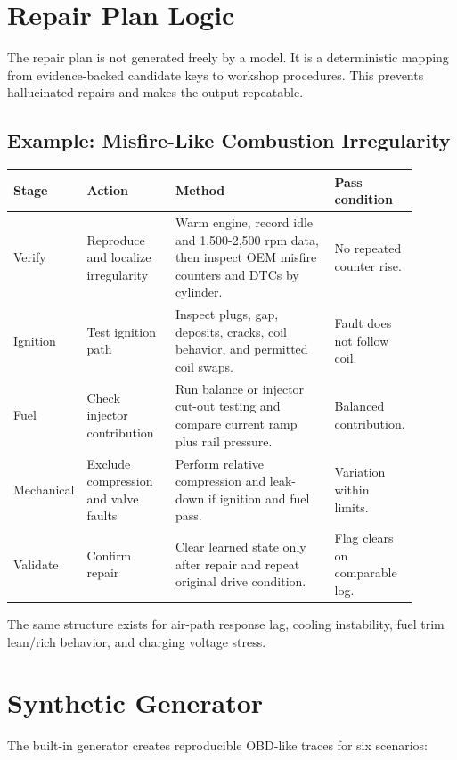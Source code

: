 \documentclass[11pt,a4paper]{article}
\begin{document}
\section{Repair Plan Logic}

The repair plan is not generated freely by a model. It is a deterministic mapping from evidence-backed candidate keys to workshop procedures. This prevents hallucinated repairs and makes the output repeatable.

\subsection{Example: Misfire-Like Combustion Irregularity}

\begin{longtable}{L{0.14\linewidth}L{0.22\linewidth}L{0.40\linewidth}L{0.14\linewidth}}
\toprule
\textbf{Stage} & \textbf{Action} & \textbf{Method} & \textbf{Pass condition} \\
\midrule
Verify & Reproduce and localize irregularity & Warm engine, record idle and 1,500-2,500 rpm data, then inspect OEM misfire counters and DTCs by cylinder. & No repeated counter rise. \\
Ignition & Test ignition path & Inspect plugs, gap, deposits, cracks, coil behavior, and permitted coil swaps. & Fault does not follow coil. \\
Fuel & Check injector contribution & Run balance or injector cut-out testing and compare current ramp plus rail pressure. & Balanced contribution. \\
Mechanical & Exclude compression and valve faults & Perform relative compression and leak-down if ignition and fuel pass. & Variation within limits. \\
Validate & Confirm repair & Clear learned state only after repair and repeat original drive condition. & Flag clears on comparable log. \\
\bottomrule
\end{longtable}

The same structure exists for air-path response lag, cooling instability, fuel trim lean/rich behavior, and charging voltage stress.

\section{Synthetic Generator}

The built-in generator creates reproducible OBD-like traces for six scenarios:
\end{document}
